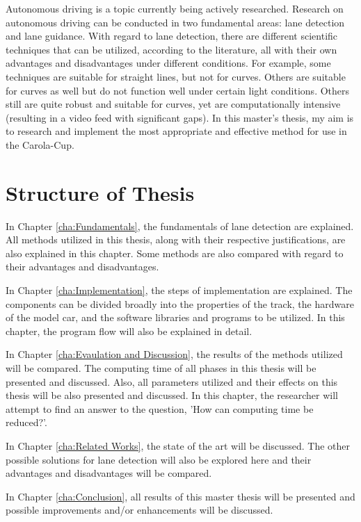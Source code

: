 Autonomous driving is a topic currently being actively researched. Research on 
autonomous driving can be conducted in two fundamental areas: lane detection and lane guidance. With regard to lane detection, there are different scientific techniques that can be utilized, according to the literature, all with their own advantages and disadvantages under different conditions. For example, some techniques are suitable for straight lines, but not for curves. Others are suitable for curves as well but do not function well under certain light conditions. Others still are quite robust and suitable for curves, yet are computationally intensive (resulting in a video feed with significant gaps). In this master's thesis, my aim is to research and implement the most appropriate and effective method for use in the Carola-Cup.

\section{Structure of Thesis}\label{sec:Structure of Thesis}


In Chapter \ref{cha:Fundamentals}, the fundamentals of lane detection are explained. All methods utilized in this thesis, along with their respective justifications, are also explained in this chapter. Some methods are also compared with regard to their advantages and disadvantages.


In Chapter \ref{cha:Implementation}, the steps of implementation are explained. The 
components can be divided broadly into the properties of the track, the hardware of the model car, and the software libraries and programs to be utilized. In this chapter, the program flow will also be explained in detail.

In Chapter \ref{cha:Evaulation and Discussion}, the results of the methods utilized will be compared. The computing time of all phases in this thesis will be presented and discussed. Also, all parameters utilized and their effects on this thesis will be also presented and discussed. In this chapter, the researcher will attempt to find an answer to the question, 'How can computing time be reduced?'.

In Chapter \ref{cha:Related Works}, the state of the art will be discussed. The other possible solutions for lane detection will also be explored here and their advantages and disadvantages will be compared.

In Chapter \ref{cha:Conclusion}, all results of this master thesis will be presented and possible improvements and/or enhancements will be discussed.


